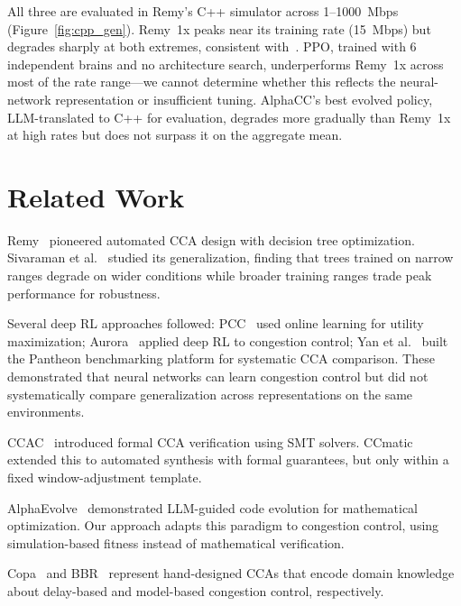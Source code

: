All three are evaluated in Remy's C++ simulator across
1--1000~Mbps (Figure~\ref{fig:cpp_gen}). Remy~1x peaks near its
training rate (15~Mbps) but degrades sharply at both extremes,
consistent with~\cite{sivaraman2014experimental}. PPO, trained
with 6 independent brains and no architecture search, underperforms
Remy~1x across most of the rate range---we cannot determine whether
this reflects the neural-network representation or insufficient
tuning. AlphaCC's best evolved policy, LLM-translated to C++ for
evaluation, degrades more gradually than Remy~1x at high rates but
does not surpass it on the aggregate mean.


\section{Related Work}

Remy~\cite{winstein2013tcp} pioneered automated CCA design with decision tree optimization. Sivaraman et al.~\cite{sivaraman2014experimental} studied its generalization, finding that trees trained on narrow ranges degrade on wider conditions while broader training ranges trade peak performance for robustness.

Several deep RL approaches followed: PCC~\cite{dong2015pcc} used online
learning for utility maximization; Aurora~\cite{jay2019deep} applied deep RL to congestion control; Yan et al.~\cite{yan2018pantheon} built the Pantheon benchmarking platform for systematic CCA comparison. These demonstrated that neural networks can learn congestion control but
did not systematically compare generalization across representations on the same environments.

CCAC~\cite{arun2021ccac} introduced formal CCA verification using
SMT solvers. CCmatic~\cite{arun2024ccmatic} extended this to automated
synthesis with formal guarantees, but only within a fixed
window-adjustment template.

AlphaEvolve~\cite{alphaevolve2025} demonstrated LLM-guided code
evolution for mathematical optimization. Our approach adapts this
paradigm to congestion control, using simulation-based fitness instead
of mathematical verification.

Copa~\cite{arun2018copa} and BBR~\cite{cardwell2017bbr} represent hand-designed CCAs that encode domain knowledge about delay-based and model-based congestion control, respectively.

